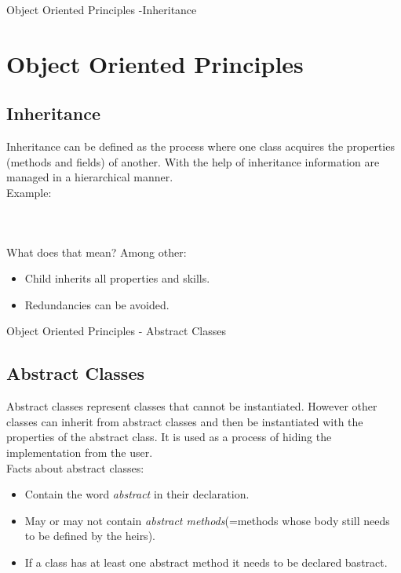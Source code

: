 \documentclass[11pt]{beamer}
\begin{document}
	\begin{frame}{Object Oriented Principles -Inheritance}
		\section{Object Oriented Principles}
		\subsection{Inheritance}
		Inheritance can be defined as the process where one class acquires the properties (methods and fields) of another. With the help of inheritance information are managed in a hierarchical manner.\\
		
		Example: 
		\begin{columns}[T,onlytextwidth]
			\begin{column}{.4\textwidth}
				\begin{minipage}{\textwidth}
					\ssmall \inputminted[firstline=3,lastline=9]{java}{code/Parent.java}
				\end{minipage}
			\end{column}
			\begin{column}{.4\textwidth}
				\begin{minipage}{\textwidth}
					\ssmall\inputminted[firstline=3,lastline=9]{java}{code/Child.java}
				\end{minipage}			
			\end{column}
		\end{columns}
		
		What does that mean? Among other:
		\begin{itemize}
			\item{Child inherits all properties and skills.}
			\item{Redundancies can be avoided.}
		\end{itemize}
	\end{frame}
	
	\begin{frame}{Object Oriented Principles - Abstract Classes}
		\subsection{Abstract Classes}
		Abstract classes represent classes that cannot be instantiated. However other classes can inherit from abstract classes and then be instantiated with the properties of the abstract class. It is used as a process of hiding the implementation from the user.\\
		
		Facts about abstract classes:
		\begin{itemize}
			\item{Contain the word \textit{abstract} in their declaration.}
			\item{May or may not contain \textit{abstract methods}(=methods whose body still needs to be defined by the heirs).}
			\item{If a class has at least one abstract method it needs to be declared bastract.}
		\end{itemize}
	\end{frame}	
	
\end{document}
